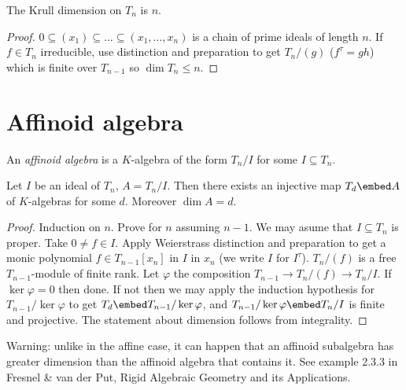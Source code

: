 \documentclass[a4paper]{article}
\begin{document}
\begin{proposition}
  The Krull dimension on \(T_n\) is \(n\).
\end{proposition}

\begin{proof}
  \(0 \subseteq (x_1) \subseteq \dots \subseteq (x_1, \dots, x_n)\) is a chain of prime ideals of length \(n\). If \(f \in T_n\) irreducible, use distinction and preparation to get \(T_n/(g)\) (\(f^\tau = gh\)) which is finite over \(T_{n - 1}\) so \(\dim T_n \leq n\).
\end{proof}

\section{Affinoid algebra}

\begin{definition}
  An \emph{affinoid algebra} is a \(K\)-algebra of the form \(T_n/I\) for some \(I \subseteq T_n\).
\end{definition}

\begin{theorem}
  Let \(I\) be an ideal of \(T_n\), \(A = T_n/I\). Then there exists an injective map \(T_d \embed A\) of \(K\)-algebras for some \(d\). Moreover \(\dim A = d\).
\end{theorem}

\begin{proof}
  Induction on \(n\). Prove for \(n\) assuming \(n - 1\). We may asume that \(I \subseteq T_n\) is proper. Take \(0 \ne f \in I\). Apply Weierstrass distinction and preparation to get a monic polynomial \(f \in T_{n - 1}[x_n]\) in \(I\) in \(x_n\) (we write \(I\) for \(I^\tau\)). \(T_n/(f)\) is a free \(T_{n - 1}\)-module of finite rank. Let \(\varphi\) the composition \(T_{n - 1} \to T_n/(f) \to T_n/I\). If \(\ker \varphi = 0\) then done. If not then we may apply the induction hypothesis for \(T_{n - 1}/\ker \varphi\) to get \(T_d \embed T_{n - 1}/\ker \varphi\), and \(T_{n - 1}/\ker \varphi \embed T_n/I\) is finite and projective. The statement about dimension follows from integrality.
\end{proof}

\begin{remark}
  Warning: unlike in the affine case, it can happen that an affinoid subalgebra has greater dimension than the affinoid algebra that contains it. See example 2.3.3 in Fresnel \& van der Put, Rigid Algebraic Geometry and its Applications.
\end{remark}
\end{document}
